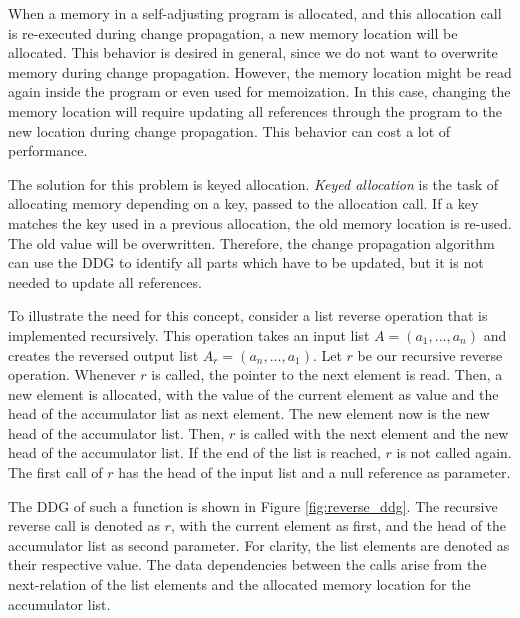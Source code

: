 When a memory in a self-adjusting program is allocated, and this allocation call is re-executed during change propagation, a new memory location will be allocated. This behavior is desired in general, since we do not want to overwrite memory during change propagation. However, the memory location might be read again inside the program or even used for memoization. In this case, changing the memory location will require updating all references through the program to the new location during change propagation. This behavior can cost a lot of performance. 

The solution for this problem is keyed allocation. \textit{Keyed allocation} is the task of allocating memory depending on a key, passed to the allocation call. If a key matches the key used in a previous allocation, the old memory location is re-used. The old value will be overwritten. Therefore, the change propagation algorithm can use the DDG to identify all parts which have to be updated, but it is not needed to update all references. 

To illustrate the need for this concept, consider a list reverse operation that is implemented recursively. This operation takes an input list $A = (a_1, ..., a_n)$ and creates the reversed output list $A_r = (a_n, ..., a_1)$. Let $r$ be our recursive reverse operation. Whenever $r$ is called, the pointer to the next element is read. Then, a new element is allocated, with the value of the current element as value and the head of the accumulator list as next element. The new element now is the new head of the accumulator list. Then, $r$ is called with the next element and the new head of the accumulator list. If the end of the list is reached, $r$ is not called again. The first call of $r$ has the head of the input list and a null reference as parameter. 

The DDG of such a function is shown in Figure \ref{fig:reverse_ddg}. The recursive reverse call is denoted as $r$, with the current element as first, and the head of the accumulator list as second parameter. For clarity, the list elements are denoted as their respective value. The data dependencies between the calls arise from the next-relation of the list elements and the allocated memory location for the accumulator list. 


